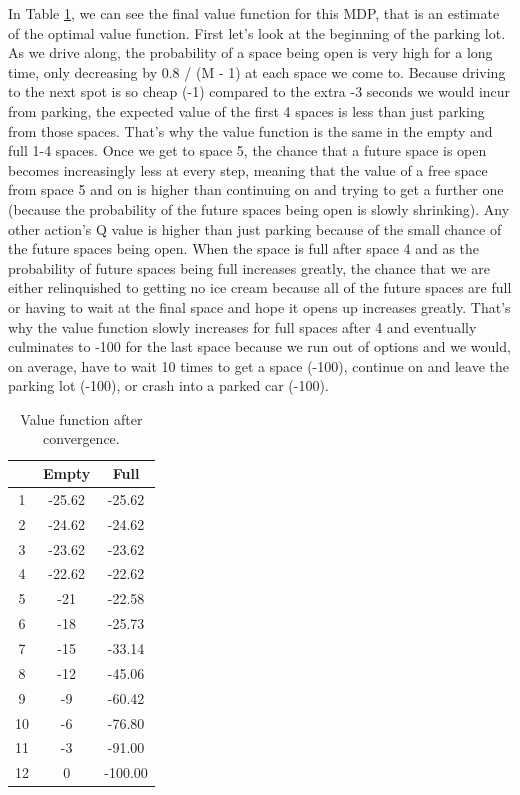 \documentclass[12pt]{article}
\begin{document}
In Table \ref{tab:value-fn}, we can see the final value function for this MDP, that is an estimate of the optimal value function. First let's look at the beginning of the parking lot. As we drive along, the probability of a space being open is very high for a long time, only decreasing by 0.8 / (M - 1) at each space we come to. Because driving to the next spot is so cheap (-1) compared to the extra -3 seconds we would incur from parking, the expected value of the first 4 spaces is less than just parking from those spaces. That's why the value function is the same in the empty and full 1-4 spaces. Once we get to space 5, the chance that a future space is open becomes increasingly less at every step, meaning that the value of a free space from space 5 and on is higher than continuing on and trying to get a further one (because the probability of the future spaces being open is slowly shrinking). Any other action's Q value is higher than just parking because of the small chance of the future spaces being open. When the space is full after space 4 and as the probability of future spaces being full increases greatly, the chance that we are either relinquished to getting no ice cream because all of the future spaces are full or having to wait at the final space and hope it opens up increases greatly. That's why the value function slowly increases for full spaces after 4 and eventually culminates to -100 for the last space because we run out of options and we would, on average, have to wait 10 times to get a space (-100), continue on and leave the parking lot (-100), or crash into a parked car (-100).

\begin{table}[]
  \centering
  \caption{Value function after convergence.}
  \label{tab:value-fn}
  \begin{tabular}{|c|c|c|}
    \hline
       & Empty  & Full    \\ \hline
    1  & -25.62 & -25.62  \\ \hline
    2  & -24.62 & -24.62  \\ \hline
    3  & -23.62 & -23.62  \\ \hline
    4  & -22.62 & -22.62  \\ \hline
    5  & -21    & -22.58  \\ \hline
    6  & -18    & -25.73  \\ \hline
    7  & -15    & -33.14  \\ \hline
    8  & -12    & -45.06  \\ \hline
    9  & -9     & -60.42  \\ \hline
    10 & -6     & -76.80  \\ \hline
    11 & -3     & -91.00  \\ \hline
    12 & 0      & -100.00 \\ \hline
  \end{tabular}
\end{table}
\end{document}
